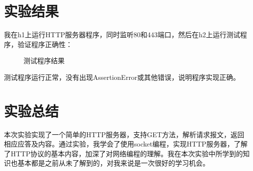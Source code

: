 \documentclass[UTF8]{article}
\begin{document}
\section{实验结果}

我在h1上运行HTTP服务器程序，同时监听80和443端口，然后在h2上运行测试程序，验证程序正确性：

\begin{figure}[H]
    \centering
    \caption{测试程序结果}
\end{figure}

测试程序运行正常，没有出现AssertionError或其他错误，说明程序实现正确。

\section{实验总结}

本次实验实现了一个简单的HTTP服务器，支持GET方法，解析请求报文，返回相应应答及内容。通过实验，我学会了使用socket编程，实现HTTP服务器，了解了HTTP协议的基本内容，加深了对网络编程的理解。我在本次实验中所学到的知识也基本都是之前从未了解到的，对我来说是一次很好的学习机会。
\end{document}
